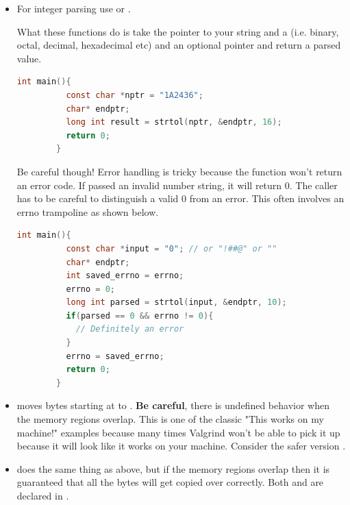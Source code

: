 \begin{itemize}
	      \textbf{Output}

	      \begin{lstlisting}
strtok
is
tricky
!!
\end{lstlisting}

	      Why is it tricky? Well what happens when upped is changed to the following?

	      \begin{lstlisting}[language=C]
        char* upped = strdup("strtok,is,tricky,,,!!");
\end{lstlisting}

	\item For integer parsing use
	      or
	      .

	      What these functions do is take the pointer to your string
	       and a  (i.e. binary, octal, decimal,
	      hexadecimal etc) and an optional pointer  and return a
	      parsed value.

	      \begin{lstlisting}[language=C]
        int main(){
          const char *nptr = "1A2436";
          char* endptr;
          long int result = strtol(nptr, &endptr, 16);
          return 0;
        }
\end{lstlisting}

	      Be careful though!
        Error handling is tricky because the function won't return an error code.
        If passed an invalid number string, it will return 0.
        The caller has to be careful to distinguish a valid 0 from an error.
        This often involves an errno trampoline as shown below.

	      \begin{lstlisting}[language=C]
        int main(){
          const char *input = "0"; // or "!##@" or ""
          char* endptr;
          int saved_errno = errno;
          errno = 0;
          long int parsed = strtol(input, &endptr, 10);
          if(parsed == 0 && errno != 0){
            // Definitely an error
          }
          errno = saved_errno;
          return 0;
        }
\end{lstlisting}

	    \item {} moves  bytes starting at  to .
        \textbf{Be careful}, there is undefined behavior when the memory regions overlap.
        This is one of the classic "This works on my machine!" examples because many times Valgrind won't be able to pick it up because it will look like it works on your machine.
        Consider the safer version .

	    \item {} does the same thing as above, but if the memory regions overlap then it is guaranteed that all the bytes will get copied over correctly.
        Both  and  are declared in .
\end{itemize}


